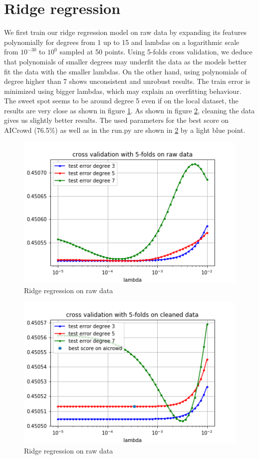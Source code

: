 \documentclass[11pt, a4paper, twocolumn]{article}
\begin{document}
\section{Ridge regression}
We first train our ridge regression model on raw data by
expanding its features polynomially for degrees from 1 up
to 15 and lambdas on a
logarithmic scale from $10^{-30}$ to
$10^0$ sampled at 50 points. Using 5-folds cross validation, we deduce that
polynomials of smaller degrees may underfit the data as
the models better fit the data with the smaller lambdas.
On the other hand, using polynomials of degree higher than
7 shows unconsistent and unrobust results. The train error
is minimized using bigger lambdas, which may explain an
overfitting behaviour. The sweet spot
seems to be around degree 5 even if on
the local dataset, the results are very
close  as shown in figure
\ref{fig:ridge_raw}. As shown in figure
\ref{fig:ridge_clean}, cleaning the data
gives us slightly better results. The used
parameters for the best score on AICrowd (76.5\%)
as well as in the run.py are shown in
\ref{fig:ridge_clean} by a light blue
point.

\begin{figure}[h!]
  \includegraphics[width=\linewidth]{plots/ridge_raw.png}
  \caption{Ridge regression on raw data}
  \label{fig:ridge_raw}
\end{figure}

\begin{figure}[h!]
  \includegraphics[width=\linewidth]{plots/ridge_clean.png}
  \caption{Ridge regression on raw data}
  \label{fig:ridge_clean}
\end{figure}
\end{document}
